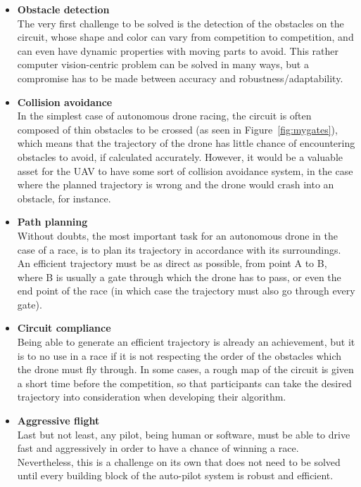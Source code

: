 \begin{itemize}
	\item{\textbf{Obstacle detection\\}
		The very first challenge to be solved is the detection of the obstacles
		on the circuit, whose shape and color can vary from competition to
		competition, and can even have dynamic properties with moving parts to
		avoid. This rather computer vision-centric problem can be solved
		in many ways, but a compromise has to be made between accuracy and
		robustness/adaptability.
	}
	\item{\textbf{Collision avoidance\\}
		In the simplest case of autonomous drone racing, the circuit is often
		composed of thin obstacles to be crossed (as seen in
		Figure~\ref{fig:mygates}), which means that the trajectory of the drone
		has little chance of encountering obstacles to avoid, if calculated
		accurately. However, it would be a valuable asset for the UAV to have
		some sort of collision avoidance system, in the case where the planned
		trajectory is wrong and the drone would crash into an obstacle, for
		instance.
	}
	\item{\textbf{Path planning\\}
		Without doubts, the most important task for an autonomous drone in the
		case of a race, is to plan its trajectory in accordance with its
		surroundings. An efficient trajectory must be as direct as possible,
		from point A to B, where B is usually a gate through which the drone
		has to pass, or even the end point of the race (in which case the
		trajectory must also go through every gate).
	}
	\item{\textbf{Circuit compliance\\}
		Being able to generate an efficient trajectory is already an
		achievement, but it is to no use in a race if it is not respecting the
		order of the obstacles which the drone must fly through. In some cases,
		a rough map of the circuit is given a short time before the
		competition, so that participants can take the desired trajectory into
		consideration when developing their algorithm.
	}
	\item{\textbf{Aggressive flight\\}
		Last but not least, any pilot, being human or software, must be able to
		drive fast and aggressively in order to have a chance of winning a
		race.  Nevertheless, this is a challenge on its own that does not need
		to be solved until every building block of the auto-pilot system is
		robust and efficient.\\
	}
\end{itemize}

